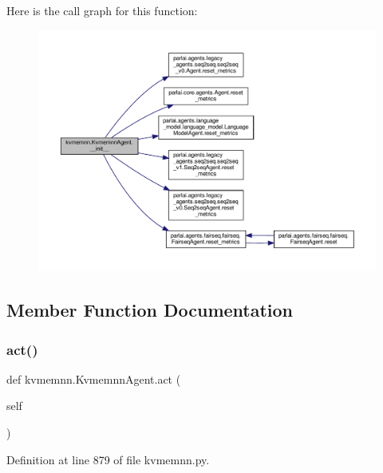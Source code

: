 Here is the call graph for this function\+:
\nopagebreak
\begin{figure}[H]
\begin{center}
\leavevmode
\includegraphics[width=350pt]{classkvmemnn_1_1KvmemnnAgent_a7a510bb5ac2444d5a30715c77bf55684_cgraph}
\end{center}
\end{figure}


\subsection{Member Function Documentation}
\mbox{\label{classkvmemnn_1_1KvmemnnAgent_a6f57723b871277392a3f3fd627c717d8}} 
\subsubsection{\texorpdfstring{act()}{act()}}
{\footnotesize\ttfamily def kvmemnn.\+Kvmemnn\+Agent.\+act (\begin{DoxyParamCaption}\item[{}]{self }\end{DoxyParamCaption})}



Definition at line 879 of file kvmemnn.\+py.



